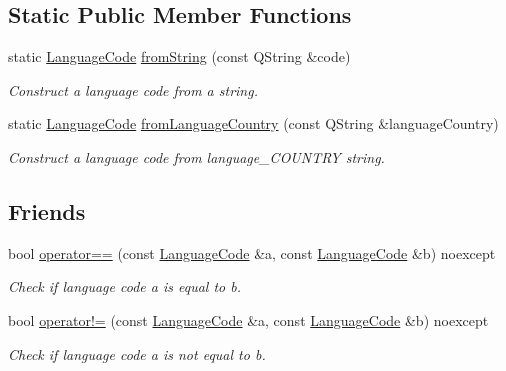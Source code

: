 \subsection*{Static Public Member Functions}
\begin{DoxyCompactItemize}
\item 
static \hyperlink{class_mdt_1_1_translation_1_1_language_code}{Language\+Code} \hyperlink{class_mdt_1_1_translation_1_1_language_code_a597ab332f6cbae3d5a73e5b88be060f0}{from\+String} (const Q\+String \&code)
\begin{DoxyCompactList}\small\item\em Construct a language code from a string. \end{DoxyCompactList}\item 
static \hyperlink{class_mdt_1_1_translation_1_1_language_code}{Language\+Code} \hyperlink{class_mdt_1_1_translation_1_1_language_code_a9bf1128196c0e6156d377ffa38e726e0}{from\+Language\+Country} (const Q\+String \&language\+Country)
\begin{DoxyCompactList}\small\item\em Construct a language code from language\+\_\+\+C\+O\+U\+N\+T\+RY string. \end{DoxyCompactList}\end{DoxyCompactItemize}
\subsection*{Friends}
\begin{DoxyCompactItemize}
\item 
bool \hyperlink{class_mdt_1_1_translation_1_1_language_code_ac82c7149b51ebc8f086ca3e98e061dbd}{operator==} (const \hyperlink{class_mdt_1_1_translation_1_1_language_code}{Language\+Code} \&a, const \hyperlink{class_mdt_1_1_translation_1_1_language_code}{Language\+Code} \&b) noexcept\hypertarget{class_mdt_1_1_translation_1_1_language_code_ac82c7149b51ebc8f086ca3e98e061dbd}{}\label{class_mdt_1_1_translation_1_1_language_code_ac82c7149b51ebc8f086ca3e98e061dbd}

\begin{DoxyCompactList}\small\item\em Check if language code {\itshape a} is equal to {\itshape b}. \end{DoxyCompactList}\item 
bool \hyperlink{class_mdt_1_1_translation_1_1_language_code_a80e4995d8bad8c348f8793800315e35c}{operator!=} (const \hyperlink{class_mdt_1_1_translation_1_1_language_code}{Language\+Code} \&a, const \hyperlink{class_mdt_1_1_translation_1_1_language_code}{Language\+Code} \&b) noexcept\hypertarget{class_mdt_1_1_translation_1_1_language_code_a80e4995d8bad8c348f8793800315e35c}{}\label{class_mdt_1_1_translation_1_1_language_code_a80e4995d8bad8c348f8793800315e35c}

\begin{DoxyCompactList}\small\item\em Check if language code {\itshape a} is not equal to {\itshape b}. \end{DoxyCompactList}\end{DoxyCompactItemize}


